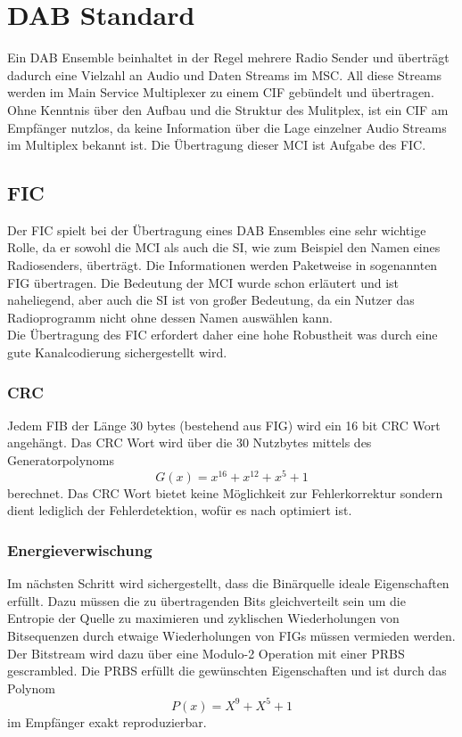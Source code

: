 \chapter{DAB Standard}

Ein DAB Ensemble beinhaltet in der Regel mehrere Radio Sender und überträgt dadurch eine Vielzahl an Audio und Daten Streams im \ac{MSC}. All diese Streams werden im Main Service Multiplexer zu einem \ac{CIF} gebündelt und übertragen. Ohne Kenntnis über den Aufbau und die Struktur des Mulitplex, ist ein \ac{CIF} am Empfänger nutzlos, da keine Information über die Lage einzelner Audio Streams im Multiplex bekannt ist. Die Übertragung dieser \ac{MCI} ist Aufgabe des \ac{FIC}.

\section{FIC}
Der \ac{FIC} spielt bei der Übertragung eines DAB Ensembles eine sehr wichtige Rolle, da er sowohl die \ac{MCI} als auch die \ac{SI}, wie zum Beispiel den Namen eines Radiosenders, überträgt. Die Informationen werden Paketweise in sogenannten \ac{FIG} übertragen. Die Bedeutung der \ac{MCI} wurde schon erläutert und ist naheliegend, aber auch die \ac{SI} ist von großer Bedeutung, da ein Nutzer das Radioprogramm nicht ohne dessen Namen auswählen kann. \\
Die Übertragung des FIC erfordert daher eine hohe Robustheit was durch eine gute Kanalcodierung sichergestellt wird.

\subsection{\ac{CRC}}
Jedem \ac{FIB} der Länge 30 bytes (bestehend aus \ac{FIG}) wird ein 16 bit \ac{CRC} Wort angehängt. Das \ac{CRC} Wort wird über die 30 Nutzbytes mittels des Generatorpolynoms
\begin{equation}
G(x) = x^{16} + x^{12} + x^5 + 1
\end{equation}
berechnet. Das CRC Wort bietet keine Möglichkeit zur Fehlerkorrektur sondern dient lediglich der Fehlerdetektion, wofür es nach \cite{crc:recommendation} optimiert ist.
\subsection{Energieverwischung}
Im nächsten Schritt wird sichergestellt, dass die Binärquelle ideale Eigenschaften erfüllt. Dazu müssen die zu übertragenden Bits gleichverteilt sein um die Entropie der Quelle zu maximieren und zyklischen Wiederholungen von Bitsequenzen durch etwaige Wiederholungen von \ac{FIG}s müssen vermieden werden. Der Bitstream wird dazu über eine Modulo-2 Operation mit einer \ac{PRBS} gescrambled. Die \ac{PRBS} erfüllt die gewünschten Eigenschaften und ist durch das Polynom
\begin{equation}
P(x) = X^9 + X^5 + 1
\end{equation}
im Empfänger exakt reproduzierbar.

